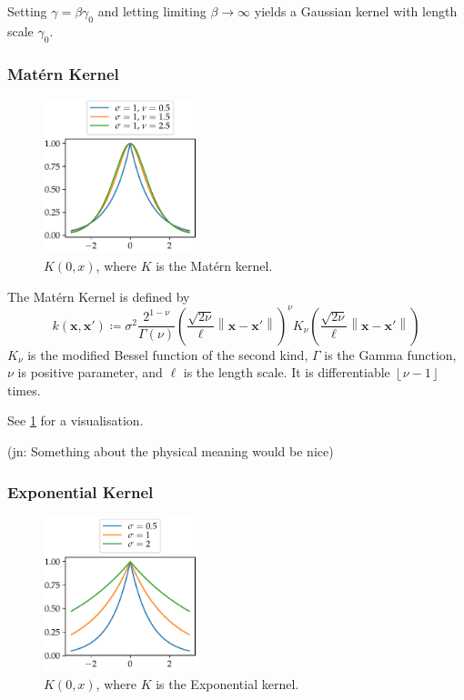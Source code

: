 \documentclass[11pt,twoside]{report}
\newcommand\bx{\mathbf{x}}
\newcommand\norm[1]{\left\|#1\right\|}
\newcommand\floor[1]{\left\lfloor#1\right\rfloor}
\newcommand\jn[1]{{\color{red}(jn: #1)}}
\begin{document}
Setting $\gamma = \beta \gamma_0$ and letting limiting $\beta \to \infty$ yields a Gaussian kernel with length scale $\gamma_0$.

\subsubsection{Mat\'ern Kernel}

  \begin{figure}
    \centering
    \includegraphics[width=0.4\textwidth]{matern_kernel_plot.pdf}
    \caption{$K(0, x)$, where $K$ is the Mat\'ern kernel.}
    \label{fig:matern_kernel}
  \end{figure}

The Mat\'ern Kernel is defined by \[
    k(\bx, \bx') \coloneqq \sigma^2\frac{2^{1-\nu}}{\Gamma(\nu)}\left(\frac{\sqrt{2\nu}}{\ell}\norm{\bx - \bx'}\right)^\nu K_\nu\left(\frac{\sqrt{2\nu}}{\ell}\norm{\bx - \bx'}\right)
\]$K_\nu$ is the modified Bessel function of the second kind, $\Gamma$ is the Gamma function, $\nu$ is positive parameter, and $\ell$ is the length scale. It is differentiable $\floor{\nu-1}$ times.

See \cref{fig:matern_kernel} for a visualisation.

\jn{Something about the physical meaning would be nice}

\subsubsection{Exponential Kernel}

  \begin{figure}
    \centering
    \includegraphics[width=0.4\textwidth]{exponential_kernel_plot.pdf}
    \caption{$K(0, x)$, where $K$ is the Exponential kernel.}
    \label{fig:exponential_kernel}
  \end{figure}
\end{document}
